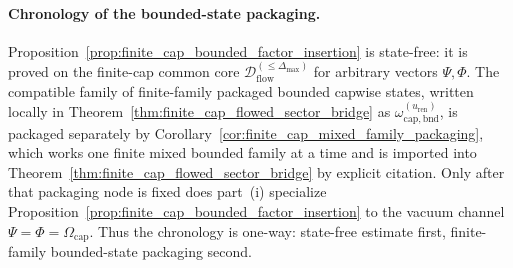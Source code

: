 \paragraph{Chronology of the bounded-state packaging.}
Proposition~\ref{prop:finite_cap_bounded_factor_insertion} is state-free: it is proved on the finite-cap common core
\(\mathcal D^{(\le \Delta_{\max})}_{\mathrm{flow}}\) for arbitrary vectors \(\Psi,\Phi\).
The compatible family of finite-family packaged bounded capwise states, written locally in Theorem~\ref{thm:finite_cap_flowed_sector_bridge} as
\(\omega_{\mathrm{cap,bnd}}^{(u_{\mathrm{ren}})}\), is packaged separately by Corollary~\ref{cor:finite_cap_mixed_family_packaging}, which works one finite mixed bounded family at a time and is imported into Theorem~\ref{thm:finite_cap_flowed_sector_bridge} by explicit citation.
Only after that packaging node is fixed does part~(i) specialize Proposition~\ref{prop:finite_cap_bounded_factor_insertion} to the vacuum channel \(\Psi=\Phi=\Omega_{\mathrm{cap}}\).
Thus the chronology is one-way: state-free estimate first, finite-family bounded-state packaging second.

